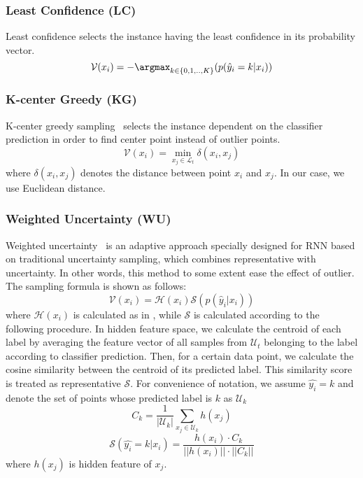 \subsubsection{Least Confidence (LC)}
    Least confidence selects the instance having the least confidence in its probability vector. 
    $$ \mathcal{V}(x_i) = - \argmax_{k \in \{0,1,..,K\}}(p(\hat{y}_i=k|x_i))$$

\subsubsection{K-center Greedy (KG)}
    K-center greedy sampling~\cite{sener2017geometric} selects the instance dependent on the classifier prediction in order to find center point instead of outlier points.
    $$\mathcal{V}(x_i) = \min_{x_j \in \mathcal{L}_t}\delta(x_i,x_j)$$
    where $\delta(x_i,x_j)$ denotes the distance between point $x_i$ and $x_j$. In our case, we use Euclidean distance.
    
\subsubsection{Weighted Uncertainty (WU)}
    Weighted uncertainty~\cite{zhao2017deep} is an adaptive approach specially designed for RNN based on traditional uncertainty sampling, which combines representative with uncertainty. In other words, this method to some extent ease the effect of outlier. The sampling formula is shown as follows:
    $$ \mathcal{V}(x_i) = \mathcal{H}(x_i) \mathcal{S}(p(\hat{y}_i|x_i))$$
    where $\mathcal{H}(x_i)$ is calculated as in , while $\mathcal{S}$ is calculated according to the following procedure. 
    In hidden feature space, we calculate the centroid of each label by averaging the feature vector of all samples from $\mathcal{U}_t$ belonging to the label according to classifier prediction. Then, for a certain data point, we calculate the cosine similarity between the centroid of its predicted label. This similarity score is treated as representative $\mathcal{S}$.  For convenience of notation, we assume $\hat{y_i} = k$ and denote the set of points whose predicted label is $k$ as $\mathcal{U}_k$
    $$C_k = \frac{1}{|\mathcal{U}_k|} \sum_{x_j \in \mathcal{U}_k} h(x_j)$$
    $$\mathcal{S}(\hat{y_i} = k|x_i) = \frac{h(x_i) \cdot C_k}{||h(x_i)|| \cdot ||C_k||} $$
where $h(x_j)$ is hidden feature of $x_j$.

